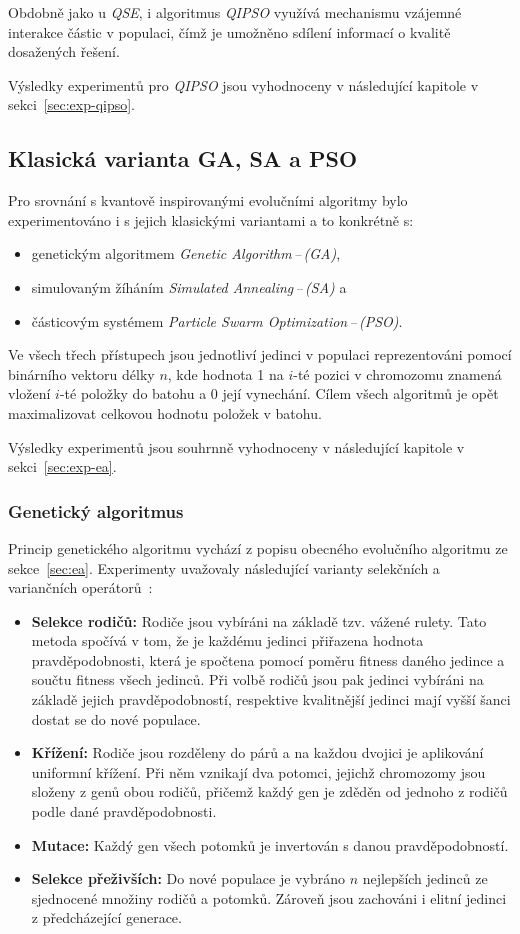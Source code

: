 Obdobně jako u \emph{QSE}, i algoritmus \emph{QIPSO} využívá mechanismu vzájemné interakce částic v populaci, čímž je umožněno sdílení informací o kvalitě dosažených řešení. 

Výsledky experimentů pro \emph{QIPSO} jsou vyhodnoceny v následující kapitole v sekci~\ref{sec:exp-qipso}.

\subsection*{Klasická varianta GA, SA a PSO}
Pro srovnání s kvantově inspirovanými evolučními algoritmy bylo experimentováno i s jejich klasickými variantami a to konkrétně s:
\begin{itemize}
  \item genetickým algoritmem \emph{Genetic Algorithm\,--\,(GA)},
  \item simulovaným žíháním \emph{Simulated Annealing\,--\,(SA)} a
  \item částicovým systémem \emph{Particle Swarm Optimization\,--\,(PSO)}.
\end{itemize}
Ve všech třech přístupech jsou jednotliví jedinci v populaci reprezentováni pomocí binárního vektoru délky $n$, kde hodnota 1 na $i$-té pozici v chromozomu znamená vložení $i$-té položky do batohu a 0 její vynechání. 
Cílem všech algoritmů je opět maximalizovat celkovou hodnotu položek v batohu.

Výsledky experimentů jsou souhrnně vyhodnoceny v následující kapitole v sekci~\ref{sec:exp-ea}.

\subsubsection*{Genetický algoritmus}
Princip genetického algoritmu vychází z popisu obecného evolučního algoritmu ze sekce~\ref{sec:ea}. 
Experimenty uvažovaly následující varianty selekčních a variančních operátorů~\cite{ga-app}:
\begin{itemize}
    \item \textbf{Selekce rodičů:} Rodiče jsou vybíráni na základě tzv. vážené rulety. 
        Tato metoda spočívá v tom, že je každému jedinci přiřazena hodnota pravděpodobnosti, která je spočtena pomocí poměru fitness daného jedince a součtu fitness všech jedinců. 
        Při volbě rodičů jsou pak jedinci vybíráni na základě jejich pravděpodobností, respektive kvalitnější jedinci mají vyšší šanci dostat se do nové populace.
    \item \textbf{Křížení:} Rodiče jsou rozděleny do párů a na každou dvojici je aplikování uniformní křížení. 
        Při něm vznikají dva potomci, jejichž chromozomy jsou složeny z genů obou rodičů, přičemž každý gen je zděděn od jednoho z rodičů podle dané pravděpodobnosti.
    \item \textbf{Mutace:} Každý gen všech potomků je invertován s danou pravděpodobností.
    \item \textbf{Selekce přeživších:} Do nové populace je vybráno $n$ nejlepších jedinců ze sjednocené množiny rodičů a potomků. 
        Zároveň jsou zachováni i elitní jedinci z předcházející generace. 
\end{itemize}

